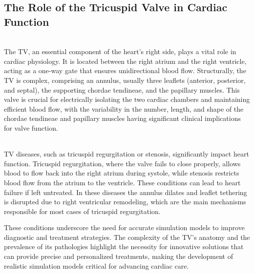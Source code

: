 
\subsection{The Role of the Tricuspid Valve in Cardiac Function}
\\
The \gls{TV}, an essential component of the heart's right side, plays a vital role in cardiac physiology. It is located between the right atrium and the right ventricle, acting as a one-way gate that ensures unidirectional blood flow. Structurally, the \gls{TV} is complex, comprising an annulus, usually three leaflets (anterior, posterior, and septal), the supporting chordae tendineae, and the papillary muscles. This valve is crucial for electrically isolating the two cardiac chambers and maintaining efficient blood flow, with the variability in the number, length, and shape of the chordae tendineae and papillary muscles having significant clinical implications for valve function. 

\\
\gls{TV} diseases, such as tricuspid regurgitation or stenosis, significantly impact heart function. Tricuspid regurgitation, where the valve fails to close properly, allows blood to flow back into the right atrium during systole, while stenosis restricts blood flow from the atrium to the ventricle. These conditions can lead to heart failure if left untreated. In these diseases the annulus dilates and leaflet tethering is disrupted due to right ventricular remodeling, which are the main mechanisms responsible for most cases of tricuspid regurgitation.

These conditions underscore the need for accurate simulation models to improve diagnostic and treatment strategies. The complexity of the \gls{TV}'s anatomy and the prevalence of its pathologies highlight the necessity for innovative solutions that can provide precise and personalized treatments, making the development of realistic simulation models critical for advancing cardiac care.


